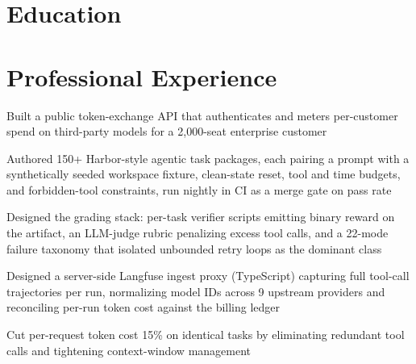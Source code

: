 \documentclass[10pt]{article}
\begin{document}

\section{Education}


\section{Professional Experience}
\begin{bullets}
  \item Built a public token-exchange API that authenticates and meters per-customer spend on third-party models for a 2,000-seat enterprise customer
  \item Authored 150+ Harbor-style agentic task packages, each pairing a prompt with a synthetically seeded workspace fixture, clean-state reset, tool and time budgets, and forbidden-tool constraints, run nightly in CI as a merge gate on pass rate
  \item Designed the grading stack: per-task verifier scripts emitting binary reward on the artifact, an LLM-judge rubric penalizing excess tool calls, and a 22-mode failure taxonomy that isolated unbounded retry loops as the dominant class
  \item Designed a server-side Langfuse ingest proxy (TypeScript) capturing full tool-call trajectories per run, normalizing model IDs across 9 upstream providers and reconciling per-run token cost against the billing ledger
  \item Cut per-request token cost 15\% on identical tasks by eliminating redundant tool calls and tightening context-window management
\end{bullets}
\end{document}
